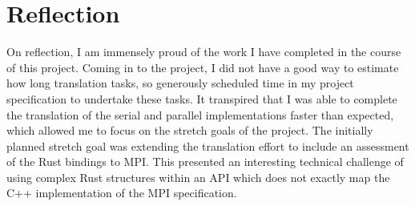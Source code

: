 

\section{Reflection}
\label{sec:reflection}


On reflection, I am immensely proud of the work I have completed in the course of this project. Coming in to the project, I did not have a good way to estimate how long translation tasks, so generously scheduled time in my project specification to undertake these tasks. It transpired that I was able to complete the translation of the serial and parallel implementations faster than expected, which allowed me to focus on the stretch goals of the project. The initially planned stretch goal was extending the translation effort to include an assessment of the Rust bindings to MPI. This presented an interesting technical challenge of using complex Rust structures within an API which does not exactly map the C++ implementation of the MPI specification.


